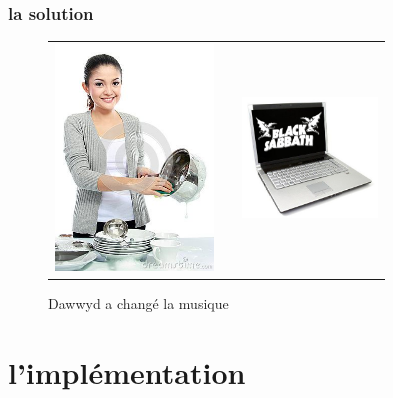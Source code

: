 \documentclass{beamer}
\begin{document}
\begin{frame}
	
	\frametitle{la solution}
	
	\begin{figure}
		\caption{Dawwyd a changé la musique}
		\begin{tabular}{ccc}
			\includegraphics[height=6cm]{mains_mouillees} & & \includegraphics[height=3.2cm]{laptop_music_2}
		\end{tabular}
	\end{figure}
	
\end{frame}

\section{l'implémentation}
\end{document}
